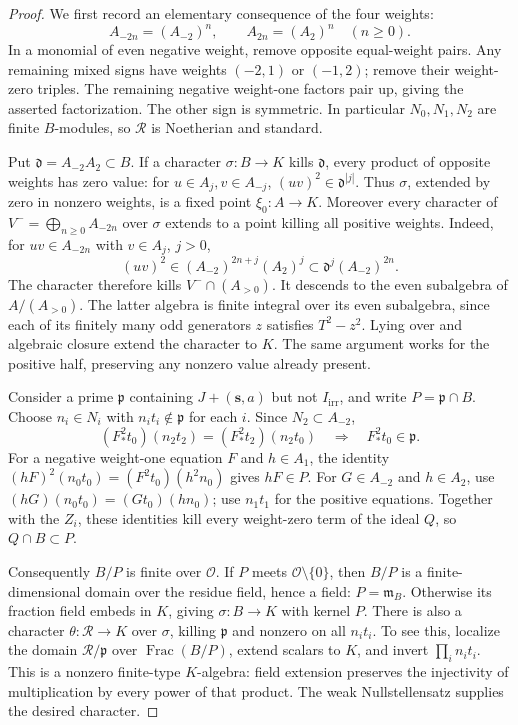 \begin{proof}
We first record an elementary consequence of the four weights:
\begin{equation}
 A_{-2n}=(A_{-2})^n,\qquad A_{2n}=(A_2)^n\quad(n\ge0).
 \label{eq:selmer-even-halves}
\end{equation}
In a monomial of even negative weight, remove opposite equal-weight
pairs. Any remaining mixed signs have weights $(-2,1)$ or $(-1,2)$;
remove their weight-zero triples. The remaining negative weight-one
factors pair up, giving the asserted factorization. The other sign is
symmetric. In particular $N_0,N_1,N_2$ are finite $B$-modules, so
$\mathcal R$ is Noetherian and standard.

Put $\mathfrak d=A_{-2}A_2\subset B$. If a character
$\sigma:B\to K$ kills $\mathfrak d$, every product of opposite
weights has zero value: for $u\in A_j,v\in A_{-j}$,
$(uv)^2\in\mathfrak d^{|j|}$. Thus $\sigma$, extended by zero in
nonzero weights, is a fixed point $\xi_0:A\to K$.
Moreover every character of $V^-=\bigoplus_{n\ge0}A_{-2n}$ over
$\sigma$ extends to a point killing all positive weights. Indeed,
for $uv\in A_{-2n}$ with $v\in A_j$, $j>0$,
\[
 (uv)^2\in (A_{-2})^{2n+j}(A_2)^j
 \subset\mathfrak d^j(A_{-2})^{2n}.
\]
The character therefore kills $V^-\cap(A_{>0})$. It descends to
the even subalgebra of $A/(A_{>0})$. The latter algebra is finite
integral over its even subalgebra, since each of its finitely many odd
generators $z$ satisfies $T^2-z^2$. Lying over and algebraic closure
extend the character to $K$. The same argument works for the positive
half, preserving any nonzero value already present.

Consider a prime $\mathfrak p$ containing $J+(\boldsymbol s,a)$
but not $I_{\mathrm{irr}}$, and write $P=\mathfrak p\cap B$.
Choose $n_i\in N_i$ with $n_it_i\notin\mathfrak p$ for each $i$.
Since $N_2\subset A_{-2}$,
\[
 (F_*^2t_0)(n_2t_2)=(F_*^2t_2)(n_2t_0)
 \quad\Longrightarrow\quad F_*^2t_0\in\mathfrak p.
\]
For a negative weight-one equation $F$ and $h\in A_1$, the identity
$(hF)^2(n_0t_0)=(F^2t_0)(h^2n_0)$ gives $hF\in P$.
For $G\in A_{-2}$ and $h\in A_2$, use
$(hG)(n_0t_0)=(Gt_0)(hn_0)$; use $n_1t_1$ for the positive
equations. Together with the $Z_i$, these identities kill every
weight-zero term of the ideal $Q$, so $Q\cap B\subset P$.

Consequently $B/P$ is finite over $\mathcal O$. If $P$ meets
$\mathcal O\setminus\{0\}$, then $B/P$ is a finite-dimensional
domain over the residue field, hence a field: $P=\mathfrak m_B$.
Otherwise its fraction field embeds in $K$, giving
$\sigma:B\to K$ with kernel $P$. There is also a character
$\theta:\mathcal R\to K$ over $\sigma$, killing $\mathfrak p$
and nonzero on all $n_it_i$. To see this, localize the domain
$\mathcal R/\mathfrak p$ over $\operatorname{Frac}(B/P)$, extend
scalars to $K$, and invert $\prod_i n_it_i$. This is a nonzero
finite-type $K$-algebra: field extension preserves the injectivity of
multiplication by every power of that product. The weak Nullstellensatz
supplies the desired character.


\end{proof}
